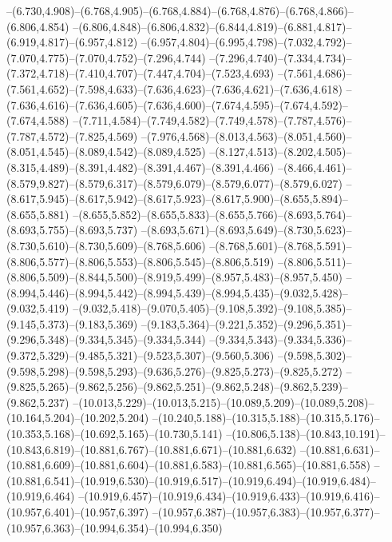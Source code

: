   --(6.730,4.908)--(6.768,4.905)--(6.768,4.884)--(6.768,4.876)--(6.768,4.866)--(6.806,4.854)%
  --(6.806,4.848)--(6.806,4.832)--(6.844,4.819)--(6.881,4.817)--(6.919,4.817)--(6.957,4.812)%
  --(6.957,4.804)--(6.995,4.798)--(7.032,4.792)--(7.070,4.775)--(7.070,4.752)--(7.296,4.744)%
  --(7.296,4.740)--(7.334,4.734)--(7.372,4.718)--(7.410,4.707)--(7.447,4.704)--(7.523,4.693)%
  --(7.561,4.686)--(7.561,4.652)--(7.598,4.633)--(7.636,4.623)--(7.636,4.621)--(7.636,4.618)%
  --(7.636,4.616)--(7.636,4.605)--(7.636,4.600)--(7.674,4.595)--(7.674,4.592)--(7.674,4.588)%
  --(7.711,4.584)--(7.749,4.582)--(7.749,4.578)--(7.787,4.576)--(7.787,4.572)--(7.825,4.569)%
  --(7.976,4.568)--(8.013,4.563)--(8.051,4.560)--(8.051,4.545)--(8.089,4.542)--(8.089,4.525)%
  --(8.127,4.513)--(8.202,4.505)--(8.315,4.489)--(8.391,4.482)--(8.391,4.467)--(8.391,4.466)%
  --(8.466,4.461)--(8.579,9.827)--(8.579,6.317)--(8.579,6.079)--(8.579,6.077)--(8.579,6.027)%
  --(8.617,5.945)--(8.617,5.942)--(8.617,5.923)--(8.617,5.900)--(8.655,5.894)--(8.655,5.881)%
  --(8.655,5.852)--(8.655,5.833)--(8.655,5.766)--(8.693,5.764)--(8.693,5.755)--(8.693,5.737)%
  --(8.693,5.671)--(8.693,5.649)--(8.730,5.623)--(8.730,5.610)--(8.730,5.609)--(8.768,5.606)%
  --(8.768,5.601)--(8.768,5.591)--(8.806,5.577)--(8.806,5.553)--(8.806,5.545)--(8.806,5.519)%
  --(8.806,5.511)--(8.806,5.509)--(8.844,5.500)--(8.919,5.499)--(8.957,5.483)--(8.957,5.450)%
  --(8.994,5.446)--(8.994,5.442)--(8.994,5.439)--(8.994,5.435)--(9.032,5.428)--(9.032,5.419)%
  --(9.032,5.418)--(9.070,5.405)--(9.108,5.392)--(9.108,5.385)--(9.145,5.373)--(9.183,5.369)%
  --(9.183,5.364)--(9.221,5.352)--(9.296,5.351)--(9.296,5.348)--(9.334,5.345)--(9.334,5.344)%
  --(9.334,5.343)--(9.334,5.336)--(9.372,5.329)--(9.485,5.321)--(9.523,5.307)--(9.560,5.306)%
  --(9.598,5.302)--(9.598,5.298)--(9.598,5.293)--(9.636,5.276)--(9.825,5.273)--(9.825,5.272)%
  --(9.825,5.265)--(9.862,5.256)--(9.862,5.251)--(9.862,5.248)--(9.862,5.239)--(9.862,5.237)%
  --(10.013,5.229)--(10.013,5.215)--(10.089,5.209)--(10.089,5.208)--(10.164,5.204)--(10.202,5.204)%
  --(10.240,5.188)--(10.315,5.188)--(10.315,5.176)--(10.353,5.168)--(10.692,5.165)--(10.730,5.141)%
  --(10.806,5.138)--(10.843,10.191)--(10.843,6.819)--(10.881,6.767)--(10.881,6.671)--(10.881,6.632)%
  --(10.881,6.631)--(10.881,6.609)--(10.881,6.604)--(10.881,6.583)--(10.881,6.565)--(10.881,6.558)%
  --(10.881,6.541)--(10.919,6.530)--(10.919,6.517)--(10.919,6.494)--(10.919,6.484)--(10.919,6.464)%
  --(10.919,6.457)--(10.919,6.434)--(10.919,6.433)--(10.919,6.416)--(10.957,6.401)--(10.957,6.397)%
  --(10.957,6.387)--(10.957,6.383)--(10.957,6.377)--(10.957,6.363)--(10.994,6.354)--(10.994,6.350)%
